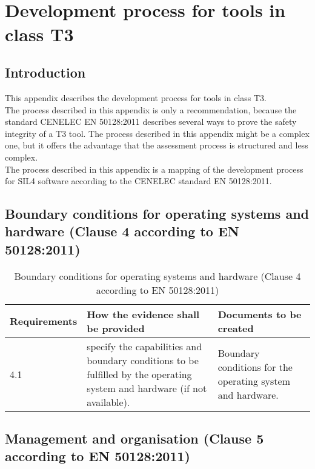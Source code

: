\documentclass{template/openetcs_report}
\begin{document}
\chapter{\\Development process for tools in class T3}
\label{annexB}

\section{Introduction}
This appendix describes the development process for tools in class T3.\\
The process described in this appendix is only a recommendation, because the standard CENELEC EN 50128:2011 describes several ways to prove the safety integrity of a T3 tool. The process described in this appendix might be a complex one, but it offers the advantage that the assessment process is structured and less complex.\\
The process described in this appendix is a mapping of the development process for SIL4 software according to the CENELEC standard EN 50128:2011.



\section{Boundary conditions for operating systems and hardware (Clause 4 according to EN 50128:2011)}
{\footnotesize\sffamily\centering
\begin{longtable}{|p{2cm}|p{9cm}|p{3cm}|}
\caption{Boundary conditions for operating systems and hardware (Clause 4 according to EN 50128:2011)}\\
\hline
\bfseries Requirements & \bfseries How the evidence shall be provided & \bfseries Documents to be created\\
\hline
\hline
\endhead
\hline
\endfoot

4.1 & specify the capabilities and boundary conditions to be fulfilled by the operating system and hardware (if not available). 
& Boundary conditions for the operating system and hardware.\\ 
\hline
\end{longtable}}


\section{Management and organisation (Clause 5 according to EN 50128:2011)}
\label{clause5}
\end{document}
